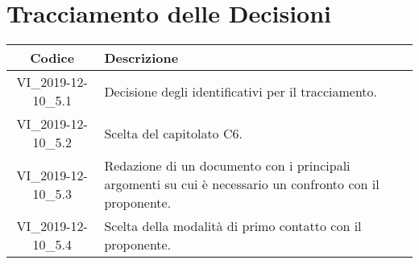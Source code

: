\section*{Tracciamento delle Decisioni}

\begin{center}
	\begin{longtable}{|c|p{12.25cm}|}
	\hline
	\rowcolor{lighter-grayer}
	\textbf{Codice} & \textbf{Descrizione} \\
	\hline
	\endfirsthead
	
	\hline
	VI\_2019-12-10\_5.1 & Decisione degli identificativi per il tracciamento. \\
	\hline
	VI\_2019-12-10\_5.2 & Scelta del capitolato C6. \\
	\hline
	VI\_2019-12-10\_5.3 & Redazione di un documento con i principali argomenti su cui è necessario un confronto con il proponente. \\
	\hline
	VI\_2019-12-10\_5.4 & Scelta della modalità di primo contatto con il proponente. \\
	\hline

	\end{longtable}
\end{center}